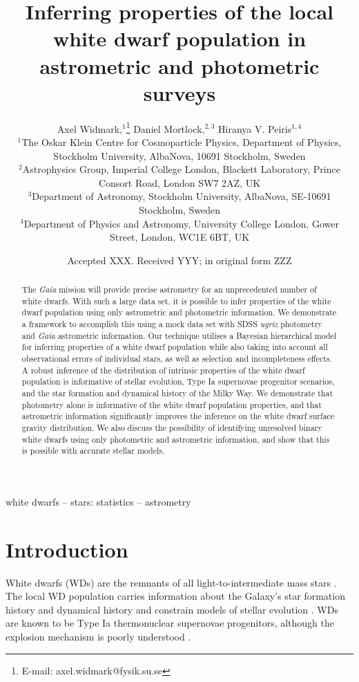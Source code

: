 \documentclass[fleqn,usenatbib]{mnras}
\title[Inferring properties of the white dwarf population]{Inferring properties of the local white dwarf population in astrometric and photometric surveys}
\author[A. Widmark et al.]{
Axel Widmark,$^1$\thanks{E-mail: axel.widmark@fysik.su.se} 
Daniel Mortlock,$^{2,3}$
Hiranya V. Peiris$^{1,4}$
\\
$^1$The Oskar Klein Centre for Cosmoparticle Physics, Department of
Physics, Stockholm University, AlbaNova, 10691 Stockholm, Sweden\\
$^2$Astrophysics Group, Imperial College London, Blackett Laboratory, Prince Consort Road, London SW7 2AZ, UK\\
$^3$Department of Astronomy, Stockholm University, AlbaNova, SE-10691 Stockholm, Sweden\\
$^4$Department of Physics and Astronomy, University College London, Gower Street, London, WC1E 6BT, UK\\
}
\date{Accepted XXX. Received YYY; in original form ZZZ}
\begin{document}
\label{firstpage}
\pagerange{\pageref{firstpage}--\pageref{lastpage}}
\maketitle

\begin{abstract}
The \emph{Gaia} mission will provide precise astrometry for an unprecedented number of white dwarfs. With such a large data set, it is possible to infer properties of the white dwarf population using only astrometric and photometric information. We demonstrate a framework to accomplish this using a mock data set with SDSS \emph{ugriz} photometry and \emph{Gaia} astrometric information.
Our technique utilises a Bayesian hierarchical model for inferring properties of a white dwarf population while also taking into account all observational errors of individual stars, as well as selection and incompleteness effects.
A robust inference of the distribution of intrinsic properties of the white dwarf population is informative of stellar evolution, Type Ia supernovae progenitor scenarios, and the star formation and dynamical history of the Milky Way.
We demonstrate that photometry alone is informative of the white dwarf population properties, and that astrometric information significantly improves the inference on the white dwarf surface gravity distribution. We also discuss the possibility of identifying unresolved binary white dwarfs using only photometric and astrometric information, and show that this is possible with accurate stellar models.
\end{abstract}

\begin{keywords}
white dwarfs -- stars: statistics -- astrometry
\end{keywords}









\section{Introduction}

White dwarfs (WDs) are the remnants of all light-to-intermediate mass stars \citep{1996ApJ...460..489R}. The local WD population carries information about the Galaxy's star formation history and dynamical history and constrain models of stellar evolution \citep{1987ApJ...315L..77W,2016NewAR..72....1G,2018arXiv180505849E}. WDs are known to be Type Ia thermonuclear supernovae progenitors, although the explosion mechanism is poorly understood \citep{Livio:2018rue}.
\end{document}
